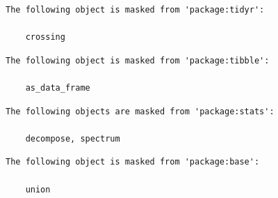 \documentclass[
  letterpaper,
  DIV=11,
  numbers=noendperiod]{scrartcl}
\begin{document}
\begin{verbatim}
The following object is masked from 'package:tidyr':

    crossing
\end{verbatim}

\begin{verbatim}
The following object is masked from 'package:tibble':

    as_data_frame
\end{verbatim}

\begin{verbatim}
The following objects are masked from 'package:stats':

    decompose, spectrum
\end{verbatim}

\begin{verbatim}
The following object is masked from 'package:base':

    union
\end{verbatim}
\end{document}
